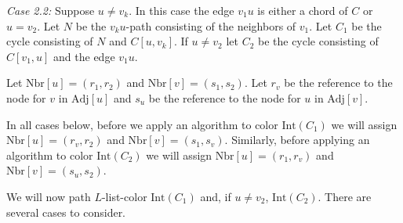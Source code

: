 \documentclass[letterpaper, 12pt]{article}
\theoremstyle{definition}
\theoremstyle{definition}
\theoremstyle{thm}
\theoremstyle{definition}
\begin{document}
\textit{Case 2.2:} Suppose $u\ne v_k$. In this case the edge $v_1u$ is either a
chord of $C$ or $u=v_2$. Let $N$ be the $v_ku$-path consisting of the neighbors
of $v_1$. Let $C_1$ be the cycle consisting of $N$ and $C[u,v_k]$. If $u\ne v_2$
let $C_2$ be the cycle consisting of $C[v_1,u]$ and the edge $v_1u$.

Let $\text{Nbr}[u]=(r_1,r_2)$ and
$\text{Nbr}[v]=(s_1,s_2)$. Let $r_v$ be the reference to the node for
$v$ in $\text{Adj}[u]$ and $s_u$ be the reference to the node for $u$ in
$\text{Adj}[v]$.

In all cases below, before we apply an algorithm to color
$\text{Int}(C_1)$ we will assign $\text{Nbr}[u]=(r_v,r_2)$ and $\text{Nbr}[v]=
(s_1,s_v)$. Similarly, before applying an algorithm to color $\text{Int}(C_2)$
we will assign $\text{Nbr}[u]=(r_1,r_v)$ and $\text{Nbr}[v]=(s_u,s_2)$.

We will now path $L$-list-color $\text{Int}(C_1)$ and, if $u\ne v_2$,
$\text{Int}(C_2)$. There are several cases to consider.
\end{document}
